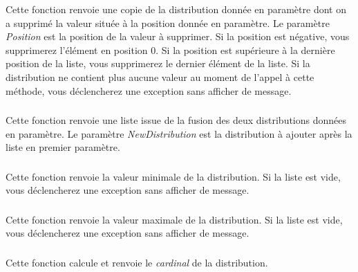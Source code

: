 \noindent Cette fonction renvoie une copie de la distribution donnée en paramètre dont on a supprimé la valeur située à la position donnée en paramètre.
Le paramètre \textit{Position} est la position de la valeur à supprimer.
Si la position est négative, vous supprimerez l'élément en position $ 0 $.
Si la position est supérieure à la dernière position de la liste, vous supprimerez le dernier élément de la liste.
Si la distribution ne contient plus aucune valeur au moment de l'appel à cette méthode, vous déclencherez une exception  sans afficher de message.


\subsubsection*{}

\noindent Cette fonction renvoie une liste issue de la fusion des deux distributions données en paramètre.
Le paramètre \textit{NewDistribution} est la distribution à ajouter après la liste en premier paramètre.



\subsubsection*{}

\noindent Cette fonction renvoie la valeur minimale de la distribution.
Si la liste est vide, vous déclencherez une exception  sans afficher de message.


\subsubsection*{}

\noindent Cette fonction renvoie la valeur maximale de la distribution.
Si la liste est vide, vous déclencherez une exception  sans afficher de message.


\subsubsection*{}

\noindent Cette fonction calcule et renvoie le \textit{cardinal} de la distribution.


\subsubsection*{}

